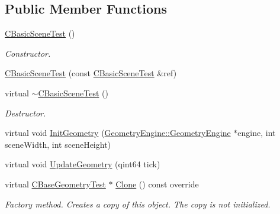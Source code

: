 \subsection*{Public Member Functions}
\begin{DoxyCompactItemize}
\item 
\mbox{\label{class_unit_test_1_1_c_basic_scene_test_aa678d150b87cecef8f7f226bcf564180}} 
\mbox{\hyperlink{class_unit_test_1_1_c_basic_scene_test_aa678d150b87cecef8f7f226bcf564180}{C\+Basic\+Scene\+Test}} ()
\begin{DoxyCompactList}\small\item\em Constructor. \end{DoxyCompactList}\item 
\mbox{\hyperlink{class_unit_test_1_1_c_basic_scene_test_a95b3e53cda711c09c0abc6a286e55af2}{C\+Basic\+Scene\+Test}} (const \mbox{\hyperlink{class_unit_test_1_1_c_basic_scene_test}{C\+Basic\+Scene\+Test}} \&ref)
\item 
\mbox{\label{class_unit_test_1_1_c_basic_scene_test_ad44e3698d8cee5ecee38e858339ff9ba}} 
virtual \mbox{\hyperlink{class_unit_test_1_1_c_basic_scene_test_ad44e3698d8cee5ecee38e858339ff9ba}{$\sim$\+C\+Basic\+Scene\+Test}} ()
\begin{DoxyCompactList}\small\item\em Destructor. \end{DoxyCompactList}\item 
virtual void \mbox{\hyperlink{class_unit_test_1_1_c_basic_scene_test_a8e16c345a72dc092c15e7f848ea69867}{Init\+Geometry}} (\mbox{\hyperlink{class_geometry_engine_1_1_geometry_engine}{Geometry\+Engine\+::\+Geometry\+Engine}} $\ast$engine, int scene\+Width, int scene\+Height)
\item 
virtual void \mbox{\hyperlink{class_unit_test_1_1_c_basic_scene_test_a670726a40875ee0981cca18a3ea7ad0b}{Update\+Geometry}} (qint64 tick)
\item 
\mbox{\label{class_unit_test_1_1_c_basic_scene_test_af2c65f878256d70f33fd2da6a0037de6}} 
virtual \mbox{\hyperlink{class_unit_test_1_1_c_base_geometry_test}{C\+Base\+Geometry\+Test}} $\ast$ \mbox{\hyperlink{class_unit_test_1_1_c_basic_scene_test_af2c65f878256d70f33fd2da6a0037de6}{Clone}} () const override
\begin{DoxyCompactList}\small\item\em Factory method. Creates a copy of this object. The copy is not initialized. \end{DoxyCompactList}\end{DoxyCompactItemize}
